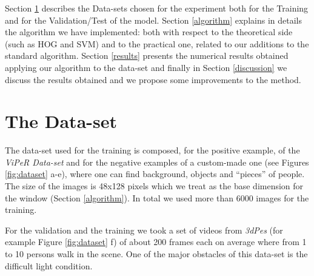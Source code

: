 \documentclass[a4paper, 10pt, onecolumn]{article} %
\begin{document}
Section \ref{dataset} describes the Data-sets chosen for the experiment both for the Training and for the Validation/Test of the model. Section \ref{algorithm} explains in details the algorithm we have implemented: both with respect to the theoretical side (such as HOG and SVM) and to the practical one, related to our additions to the standard algorithm. Section \ref{results} presents the numerical results obtained applying our algorithm to the data-set and finally in Section \ref{discussion} we discuss the results obtained and we propose some improvements to the method.


\section{The Data-set}\label{dataset}
The data-set used for the training is composed, for the positive example, of the \emph{ViPeR Data-set} and for the negative examples of a custom-made one (see Figures \ref{fig:dataset} a-e), where one can find background, objects and ``pieces'' of people. 
The size of the images is 48x128 pixels which we treat as the base dimension for the window (Section \ref{algorithm}). In total we used more than 6000 images for the training.

For the validation and the training we took a set of videos from \emph{3dPes} (for example Figure \ref{fig:dataset} f) of about 200 frames each on average where from 1 to 10 persons walk in the scene. One of the major obstacles of this data-set is the difficult light condition.
\end{document}
